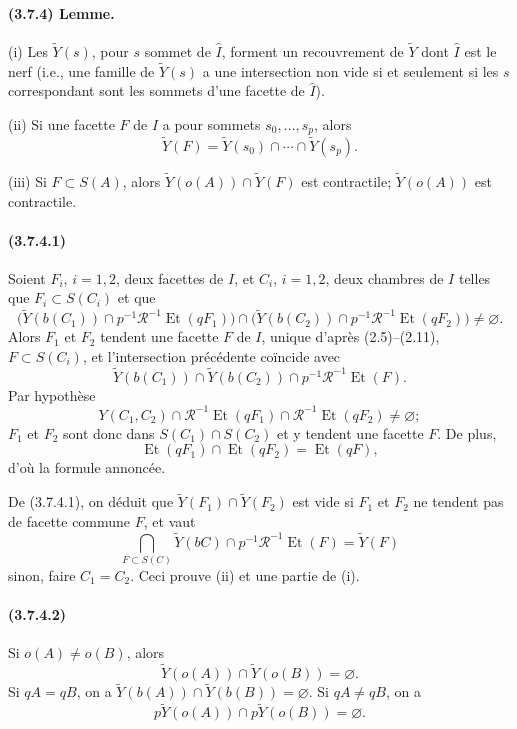 \documentclass[10pt,a4paper]{article}
\newcommand{\mcR}{\mathcal R}
\begin{document}
\paragraph{(3.7.4) Lemme.} (i) Les \(\widetilde Y(s)\), pour \(s\) sommet de \(\widehat I\), forment un recouvrement de \(\widetilde Y\) dont \(\widehat I\) est le nerf (i.e., une famille de \(\widetilde Y(s)\) a une intersection non vide si et seulement si les \(s\) correspondant sont les sommets d'une facette de \(\widehat I\)).

(ii) Si une facette \(F\) de \(I\) a pour sommets \(s_0,\ldots,s_p\), alors
\[
\widetilde Y(F)=\widetilde Y(s_0)\cap\cdots\cap\widetilde Y(s_p).
\]

(iii) Si \(F\subset S(A)\), alors \(\widetilde Y(o(A))\cap\widetilde Y(F)\) est contractile; \(\widetilde Y(o(A))\) est contractile.

\paragraph{(3.7.4.1)} Soient \(F_i\), \(i=1,2\), deux facettes de \(I\), et \(C_i\), \(i=1,2\), deux chambres de \(I\) telles que \(F_i\subset S(C_i)\) et que
\[
\bigl(\widetilde Y(b(C_1))\cap p^{-1}\mcR^{-1}\operatorname{Et}(qF_1)\bigr)
\cap
\bigl(\widetilde Y(b(C_2))\cap p^{-1}\mcR^{-1}\operatorname{Et}(qF_2)\bigr)
\ne\varnothing.
\]
Alors \(F_1\) et \(F_2\) tendent une facette \(F\) de \(I\), unique d'après (2.5)--(2.11), \(F\subset S(C_i)\), et l'intersection précédente coïncide avec
\[
\widetilde Y(b(C_1))\cap \widetilde Y(b(C_2))
\cap p^{-1}\mcR^{-1}\operatorname{Et}(F).
\]
Par hypothèse
\[
Y(C_1,C_2)\cap\mcR^{-1}\operatorname{Et}(qF_1)\cap
\mcR^{-1}\operatorname{Et}(qF_2)\ne\varnothing;
\]
\(F_1\) et \(F_2\) sont donc dans \(S(C_1)\cap S(C_2)\) et y tendent une facette \(F\). De plus,
\[
\operatorname{Et}(qF_1)\cap\operatorname{Et}(qF_2)=\operatorname{Et}(qF),
\]
d'où la formule annoncée.

De (3.7.4.1), on déduit que \(\widetilde Y(F_1)\cap\widetilde Y(F_2)\) est vide si \(F_1\) et \(F_2\) ne tendent pas de facette commune \(F\), et vaut
\[
\bigcap_{F\subset S(C)}
\widetilde Y(bC)\cap p^{-1}\mcR^{-1}\operatorname{Et}(F)
=\widetilde Y(F)
\]
sinon, faire \(C_1=C_2\). Ceci prouve (ii) et une partie de (i).

\paragraph{(3.7.4.2)} Si \(o(A)\ne o(B)\), alors
\[
\widetilde Y(o(A))\cap\widetilde Y(o(B))=\varnothing.
\]
Si \(qA=qB\), on a \(\widetilde Y(b(A))\cap \widetilde Y(b(B))=\varnothing\). Si \(qA\ne qB\), on a
\[
p\widetilde Y(o(A))\cap p\widetilde Y(o(B))=\varnothing.
\]
\end{document}
